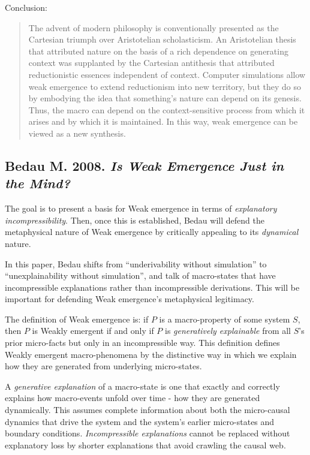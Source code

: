 \documentclass{article}
\newcommand{\ti}[1]{\textit{#1}}
\newcommand{\annbibtitle}[2]{\subsection*{#1. \ti{#2}}}
\begin{document}
Conclusion:
\begin{quote}
The advent of modern philosophy is conventionally presented as the Cartesian triumph over Aristotelian scholasticism. An Aristotelian thesis that attributed nature on the basis of a rich dependence on generating context was supplanted by the Cartesian antithesis that attributed reductionistic essences independent of context. Computer simulations allow weak emergence to extend reductionism into new territory, but they do so by embodying the idea that something's nature can depend on its genesis. Thus, the macro can depend on the context-sensitive process from which it arises and by which it is maintained. In this way, weak emergence can be viewed as a new synthesis.
\end{quote}

\annbibtitle{Bedau M. 2008}{Is Weak Emergence Just in the Mind?}

The goal is to present a basis for Weak emergence in terms of \ti{explanatory incompressibility}. Then, once this is established, Bedau will defend the metaphysical nature of Weak emergence by critically appealing to its \ti{dynamical} nature.

In this paper, Bedau shifts from ``underivability without simulation'' to ``unexplainability without simulation'', and talk of macro-states that have incompressible explanations rather than incompressible derivations. This will be important for defending Weak emergence's metaphysical legitimacy.

The definition of Weak emergence is: if $P$ is a macro-property of some system $S$, then $P$ is Weakly emergent if and only if $P$ is \ti{generatively explainable} from all $S$'s prior micro-facts but only in an incompressible way. This definition defines Weakly emergent macro-phenomena by the distinctive way in which we explain how they are generated from underlying micro-states.

A \ti{generative explanation} of a macro-state is one that exactly and correctly explains how macro-events unfold over time - how they are generated dynamically. This assumes complete information about both the micro-causal dynamics that drive the system and the system's earlier micro-states and boundary conditions. \ti{Incompressible explanations} cannot be replaced without explanatory loss by shorter explanations that avoid crawling the causal web.
\end{document}
